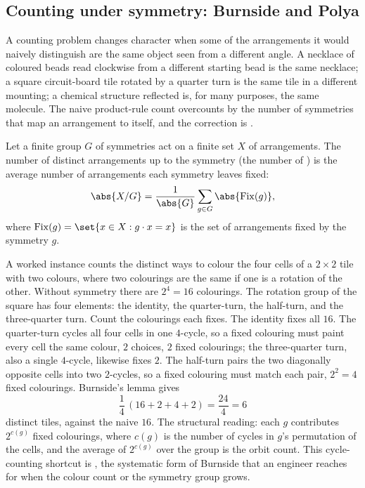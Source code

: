 \subsection{Counting under symmetry: Burnside and Polya}

A counting problem changes character when some of the arrangements
it would naively distinguish are the same object seen from a
different angle. A necklace of coloured beads read clockwise from a
different starting bead is the same necklace; a square circuit-board
tile rotated by a quarter turn is the same tile in a different
mounting; a chemical structure reflected is, for many purposes, the
same molecule. The naive product-rule count overcounts by the number
of symmetries that map an arrangement to itself, and the correction
is .

\begin{principle}
Let a finite group $G$ of symmetries act on a finite set $X$ of
arrangements. The number of distinct arrangements up to the symmetry
(the number of ) is the average number of
arrangements each symmetry leaves fixed:
\[
\abs{X / G} = \frac{1}{\abs{G}} \sum_{g \in G} \abs{\mathrm{Fix}(g)},
\]
where $\mathrm{Fix}(g) = \set{x \in X : g \cdot x = x}$ is the set of
arrangements fixed by the symmetry $g$.
\end{principle}

A worked instance counts the distinct ways to colour the four cells
of a $2 \times 2$ tile with two colours, where two colourings are the
same if one is a rotation of the other. Without symmetry there are
$2^{4} = 16$ colourings. The rotation group of the square has four
elements: the identity, the quarter-turn, the half-turn, and the
three-quarter turn. Count the colourings each fixes. The identity
fixes all $16$. The quarter-turn cycles all four cells in one
$4$-cycle, so a fixed colouring must paint every cell the same
colour, $2$ choices, $2$ fixed colourings; the three-quarter turn,
also a single $4$-cycle, likewise fixes $2$. The half-turn pairs the
two diagonally opposite cells into two $2$-cycles, so a fixed
colouring must match each pair, $2^{2} = 4$ fixed colourings.
Burnside's lemma gives
\[
\frac{1}{4}\,(16 + 2 + 4 + 2) = \frac{24}{4} = 6
\]
distinct tiles, against the naive $16$. The structural reading: each
$g$ contributes $2^{c(g)}$ fixed colourings, where $c(g)$ is the
number of cycles in $g$'s permutation of the cells, and the average
of $2^{c(g)}$ over the group is the orbit count. This cycle-counting
shortcut is , the systematic
form of Burnside that an engineer reaches for when the colour count
or the symmetry group grows.

